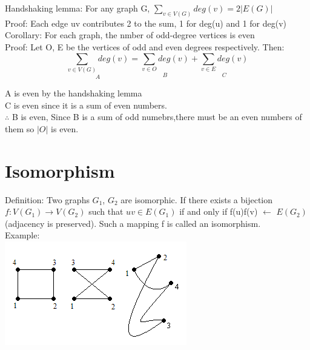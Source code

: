 \documentclass[12pt]{article}
\begin{document}
	Handshaking lemma: For any graph G, $\sum_{v \in V(G)}deg(v) = 2|E(G)|$\\
	
	Proof: Each edge uv contributes 2 to the sum, 1 for deg(u) and 1 for deg(v)\\
	
	Corollary: For each graph, the nmber of odd-degree vertices is even\\
	Proof: Let O, E be the vertices of odd and even degrees respectively. Then:\\
	$$\underset{A}{\sum_{v \in V(G)}deg(v)} = \underset{B}{\sum_{v \in O}deg(v)} + \underset{C}{\sum_{v \in E}deg(v)}$$
	
	A is even by the handshaking lemma\\
	C is even since it is a sum of even numbers.\\
	$\therefore$ B is even, Since B is a sum of odd numebrs,there must be an even numbers of them so $|O|$ is even.\\
	
	\section*{Isomorphism}
	
	Definition: Two graphs $G_1$, $G_2$ are isomorphic. If there exists a bijection $f: V(G_1) \rightarrow V(G_2)$ such that $uv \in E(G_1)$ if and only if f(u)f(v) $\leftarrow$ $E(G_2)$ (adjacency is preserved). Such  a mapping f is called an isomorphism.\\
	
	Example:\\
	\includegraphics[scale=0.5]{isomorphic.png}
	
	
	
	
\end{document}
